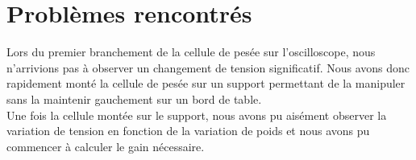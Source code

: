 \documentclass[a4paper,11pt,titlepage]{article}
\begin{document}
\section{Problèmes rencontrés}

Lors du premier branchement de la cellule de pesée sur l'oscilloscope, nous n'arrivions pas à observer un changement de tension significatif. Nous avons donc rapidement monté la cellule de pesée sur un support permettant de la manipuler sans la maintenir gauchement sur un bord de table.\\

Une fois la cellule montée sur le support, nous avons pu aisément observer la variation de tension en fonction de la variation de poids et nous avons pu commencer à calculer le gain nécessaire.
\end{document}
